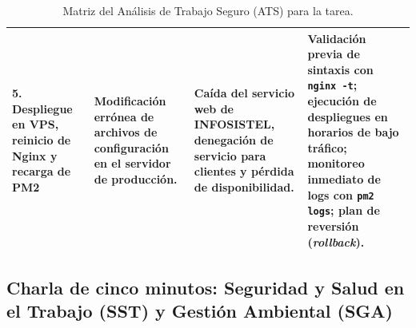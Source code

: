 \documentclass[11pt,a4paper]{article}
\begin{document}
\begin{table}[htbp]
\begin{tabularx}{\textwidth}{p{3.2cm} p{3.8cm} p{3.5cm} X}
\midrule
\rowcolor{lightrow}
\textbf{5. Despliegue en VPS, reinicio de Nginx y recarga de PM2} & Modificación errónea de archivos de configuración en el servidor de producción. & Caída del servicio web de INFOSISTEL, denegación de servicio para clientes y pérdida de disponibilidad. & Validación previa de sintaxis con \texttt{nginx -t}; ejecución de despliegues en horarios de bajo tráfico; monitoreo inmediato de logs con \texttt{pm2 logs}; plan de reversión (\textit{rollback}). \\
\bottomrule
\end{tabularx}
\caption{Matriz del Análisis de Trabajo Seguro (ATS) para la tarea.}
\end{table}

\subsection{Charla de cinco minutos: Seguridad y Salud en el Trabajo (SST) y Gestión Ambiental (SGA)}
\end{document}
